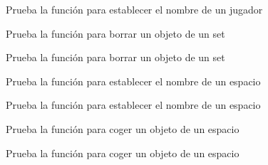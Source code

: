 \begin{DoxyRefList}
Prueba la función para establecer el nombre de un jugador  
\item[\label{test__test000230}%
\Hypertarget{test__test000230}%
Member \hyperlink{set__test_8h_a45af0aa2cb643d2809513f320a4f9af3}{test3\+\_\+set\+\_\+delete\+\_\+element} ()]Prueba la función para borrar un objeto de un set 

Prueba la función para borrar un objeto de un set  
\item[\label{test__test000244}%
\Hypertarget{test__test000244}%
Member \hyperlink{space__test_8h_aa24a337830006e33706ab6ac1c416b47}{test3\+\_\+space\+\_\+set\+\_\+name} ()]Prueba la función para establecer el nombre de un espacio 

Prueba la función para establecer el nombre de un espacio  
\item[\label{test__test000257}%
\Hypertarget{test__test000257}%
Member \hyperlink{space__test_8h_adf86020407e0f061eac304e879029cb8}{test3\+\_\+space\+\_\+take\+\_\+object} ()]Prueba la función para coger un objeto de un espacio 

Prueba la función para coger un objeto de un espacio 
\end{DoxyRefList}